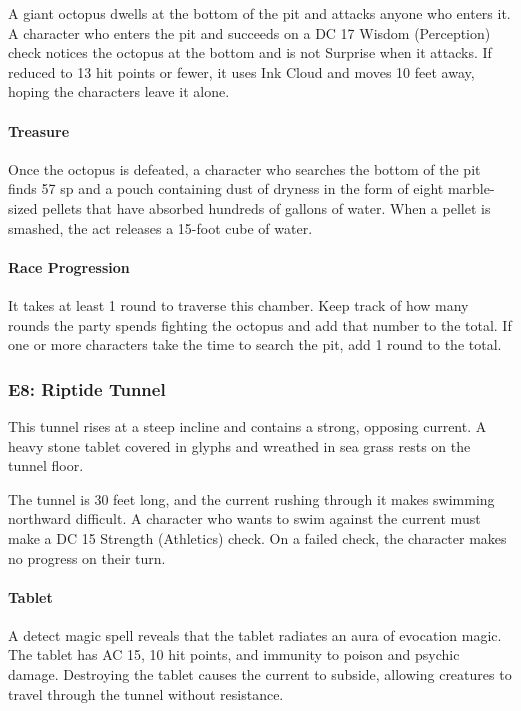 \documentclass[10pt,a4paper,twoside,bg=print,twocolumn,openany,nodeprecatedcode]{dndbook}
\begin{document}
A giant octopus dwells at the bottom of the pit and attacks anyone who enters it. A character who enters the pit and succeeds on a DC 17 Wisdom (Perception) check notices the octopus at the bottom and is not Surprise when it attacks. If reduced to 13 hit points or fewer, it uses Ink Cloud and moves 10 feet away, hoping the characters leave it alone.

\paragraph{Treasure}
Once the octopus is defeated, a character who searches the bottom of the pit finds 57 sp and a pouch containing dust of dryness in the form of eight marble-sized pellets that have absorbed hundreds of gallons of water. When a pellet is smashed, the act releases a 15-foot cube of water.

\paragraph{Race Progression}
It takes at least 1 round to traverse this chamber. Keep track of how many rounds the party spends fighting the octopus and add that number to the total. If one or more characters take the time to search the pit, add 1 round to the total.

\subsubsection{E8: Riptide Tunnel}
\begin{DndReadAloud}{}
This tunnel rises at a steep incline and contains a strong, opposing current. A heavy stone tablet covered in glyphs and wreathed in sea grass rests on the tunnel floor.

\end{DndReadAloud}

The tunnel is 30 feet long, and the current rushing through it makes swimming northward difficult. A character who wants to swim against the current must make a DC 15 Strength (Athletics) check. On a failed check, the character makes no progress on their turn.

\paragraph{Tablet}
A detect magic spell reveals that the tablet radiates an aura of evocation magic. The tablet has AC 15, 10 hit points, and immunity to poison and psychic damage. Destroying the tablet causes the current to subside, allowing creatures to travel through the tunnel without resistance.
\end{document}
